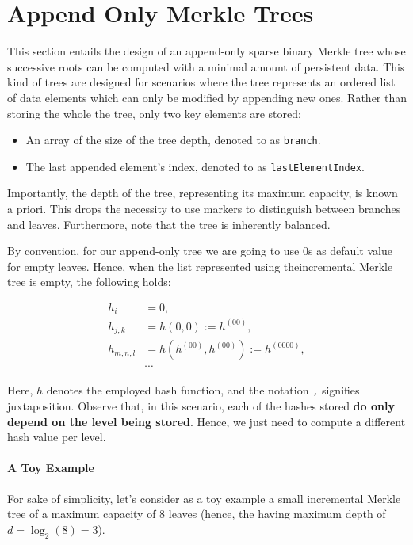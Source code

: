 

\section{Append Only Merkle Trees}

This section entails the design of an append-only sparse binary Merkle tree whose successive roots can be computed with a minimal amount of persistent data. This kind of trees are designed for scenarios where the tree represents an ordered list of data elements which can only be modified by appending new ones. Rather than storing the whole the tree, only two key elements are stored:

\begin{itemize}

\item An array of the size of the tree depth, denoted to as \texttt{branch}.

\item The last appended element's index, denoted to as \texttt{lastElementIndex}.

\end{itemize}


Importantly, the depth of the tree, representing its maximum capacity, is known a priori. This drops the necessity to use markers to distinguish between branches and leaves. Furthermore, note that the tree is inherently balanced.

By convention, for our append-only tree we are going to use $0$s as default value for empty leaves. Hence, when the list represented using theincremental Merkle tree is empty, the following holds:

\begin{align*}
h_i &= 0, \\
h_{j, k} &= h(0, 0) := h^{(00)}, \\
h_{m, n, l} &= h(h^{(00)}, h^{(00)}) := h^{(0000)}, \\
&\cdots
\end{align*}

Here, $h$ denotes the employed hash function, and the notation \texttt{,} signifies juxtaposition. Observe that, in this scenario, each of the hashes stored \textbf{do only depend on the level being stored}. Hence, we just need to compute a different hash value per level.

\paragraph*{A Toy Example}

For sake of simplicity, let’s consider as a toy example a small incremental Merkle tree of a maximum capacity of 8 leaves (hence, the having maximum depth of $d = \log_2(8) = 3$).



